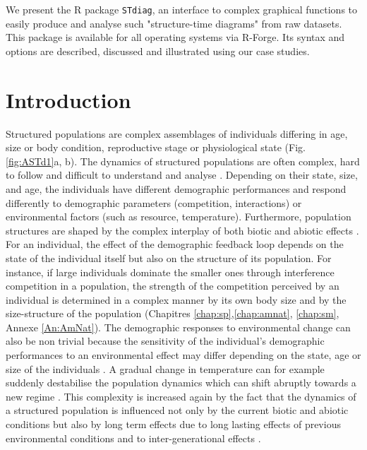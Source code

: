 We present the R package \texttt{STdiag}, an interface to complex graphical
functions to easily produce and analyse such "structure-time diagrams" from raw datasets.
This package is available for all operating systems via R-Forge. Its syntax and
options are described, discussed and illustrated using our case studies.

\section{Introduction}

Structured populations are complex assemblages of individuals differing in age,
size or body condition, reproductive stage or physiological state (Fig.
\ref{fig:ASTd1}a, b).
The dynamics of structured populations are often complex, hard to follow and
difficult to understand and analyse \autocites{benton2006a}.
Depending on their state, size, and age, the individuals have different
demographic performances and respond differently to demographic parameters
(competition, interactions) or environmental factors (such as resource,
temperature).
Furthermore, population structures are shaped by the complex interplay of both
biotic and abiotic effects \autocites{ohlberger2013a}.
For an individual, the effect of the demographic feedback loop depends on the
state of the individual itself but also on the structure of its population. For
instance, if large individuals dominate the smaller ones through interference
competition in a population, the strength of the competition perceived by an
individual is determined in a complex manner by its own body size and by the
size-structure of the population (Chapitres \ref{chap:sp},\ref{chap:amnat},
\ref{chap:sm}, Annexe \ref{An:AmNat}). The demographic responses to
environmental change can also be non trivial because the sensitivity of the
individual’s demographic performances to an environmental effect may differ
depending on the state, age or size of the individuals
\autocites{ohlberger2011a}.
A gradual change in temperature can for example suddenly destabilise the
population dynamics which can shift abruptly towards a new regime
\autocites{ohlberger2011a, nelson2013a}. This complexity is increased again by
the fact that the dynamics of a structured population is influenced not only by
the current biotic and abiotic conditions but also by long term effects due to
long lasting effects of previous environmental conditions
\autocites{baron2010a,mugabo2010a} and to inter-generational effects
\autocites{benton2008a,marquis2008a}.

